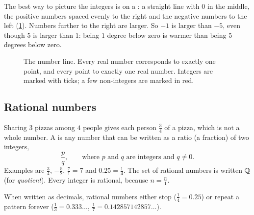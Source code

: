 The best way to picture the integers is on a : a straight
line with $0$ in the middle, the positive numbers spaced evenly to the right
and the negative numbers to the left (\cref{fig:number-line}). Numbers further
to the right are larger. So $-1$ is larger than $-5$, even though $5$ is larger
than $1$: being $1$ degree below zero is warmer than being $5$ degrees below
zero.

\begin{figure}[htbp]
\centering
{}
\caption{The number line. Every real number corresponds to exactly one point,
  and every point to exactly one real number. Integers are marked with ticks;
  a few non-integers are marked in red.}
\label{fig:number-line}
\end{figure}

\subsection{Rational numbers}

Sharing $3$ pizzas among $4$ people gives each person $\tfrac34$ of a pizza,
which is not a whole number. A  is any number that can
be written as a ratio (a fraction) of two integers,
\[
  \frac{p}{q}, \qquad\text{where $p$ and $q$ are integers and } q\neq 0.
\]
Examples are $\tfrac34$, $-\tfrac{5}{2}$, $\tfrac{7}{1}=7$ and
$0.25=\tfrac14$. The set of rational numbers is written $\mathbb{Q}$ (for
\emph{quotient}). Every integer is rational, because $n = \tfrac{n}{1}$.

When written as decimals, rational numbers either stop
($\tfrac14 = 0.25$) or repeat a pattern forever ($\tfrac13 = 0.333\ldots$,
$\tfrac{1}{7} = 0.142857142857\ldots$).

